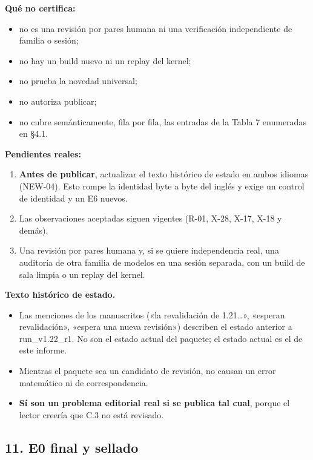 \documentclass[
]{article}
\providecommand{\tightlist}{%
  \setlength{\itemsep}{0pt}\setlength{\parskip}{0pt}}
\begin{document}
\textbf{Qué no certifica:}

\begin{itemize}
\tightlist
\item
  no es una revisión por pares humana ni una verificación independiente
  de familia o sesión;
\item
  no hay un build nuevo ni un replay del kernel;
\item
  no prueba la novedad universal;
\item
  no autoriza publicar;
\item
  no cubre semánticamente, fila por fila, las entradas de la Tabla 7
  enumeradas en §4.1.
\end{itemize}

\textbf{Pendientes reales:}

\begin{enumerate}
\def\labelenumi{\arabic{enumi}.}
\tightlist
\item
  \textbf{Antes de publicar}, actualizar el texto histórico de estado en
  ambos idiomas (NEW-04). Esto rompe la identidad byte a byte del inglés
  y exige un control de identidad y un E6 nuevos.
\item
  Las observaciones aceptadas siguen vigentes (R-01, X-28, X-17, X-18 y
  demás).
\item
  Una revisión por pares humana y, si se quiere independencia real, una
  auditoría de otra familia de modelos en una sesión separada, con un
  build de sala limpia o un replay del kernel.
\end{enumerate}

\textbf{Texto histórico de estado.}

\begin{itemize}
\tightlist
\item
  Las menciones de los manuscritos («la revalidación de 1.21\ldots»,
  «esperan revalidación», «espera una nueva revisión») describen el
  estado anterior a run\_v1.22\_r1. No son el estado actual del paquete;
  el estado actual es el de este informe.
\item
  Mientras el paquete sea un candidato de revisión, no causan un error
  matemático ni de correspondencia.
\item
  \textbf{Sí son un problema editorial real si se publica tal cual},
  porque el lector creería que C.3 no está revisado.
\end{itemize}

\subsection{11. E0 final y sellado}\label{11-e0-final-y-sellado}
\end{document}
